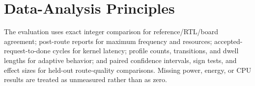 \section{Data-Analysis Principles}

The evaluation uses exact integer comparison for reference/RTL/board agreement;
post-route reports for maximum frequency and resources; accepted-request-to-done
cycles for kernel latency; profile counts, transitions, and dwell lengths for
adaptive behavior; and paired confidence intervals, sign tests, and effect sizes for
held-out route-quality comparisons. Missing power, energy, or CPU results are
treated as unmeasured rather than as zero.

